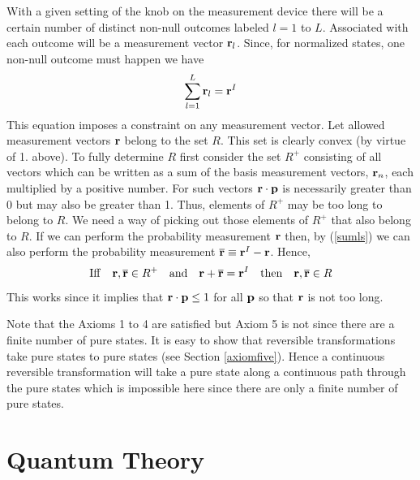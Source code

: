 \documentclass[10pt,twocolumn]{article}
\begin{document}
With a given setting of the knob on the measurement device there will be
a certain number of distinct non-null outcomes labeled $l=1$ to $L$.
Associated with each outcome will be a measurement vector ${\bf r}_l$.
Since, for normalized states, one non-null outcome must happen we have
\begin{equation}\label{sumls}
\sum_{l=1}^L {\bf r}_l = {\bf r}^I
\end{equation}
This equation imposes a constraint on any measurement vector. Let
allowed measurement vectors ${\bf r}$ belong to the set $R$. This
set is
clearly convex (by virtue of 1. above).  To fully determine $R$ first
consider the set $R^+$ consisting of all vectors which can be written
as a sum of the basis measurement vectors, ${\bf r}_n$,
each multiplied by a positive number. For
such vectors ${\bf r}\cdot{\bf p}$ is necessarily greater than 0 but may
also be greater than 1.  Thus, elements of $R^+$ may be too long to
belong to $R$.  We need a way of picking out those
elements of $R^+$ that also belong to $R$. If we can perform the
probability measurement ${\bf r}$ then, by (\ref{sumls})
we can also perform the probability measurement
$\overline{\bf r}\equiv {\bf r}^I - {\bf r}$. Hence,
\begin{equation}
{\rm Iff} \quad {\bf r},\overline{\bf r}\in R^+ \quad {\rm and} \quad
{\bf r}+\overline{\bf r}={\bf r}^I \quad{\rm then}\quad {\bf r},\overline{\bf r}\in R
\end{equation}
This works since it implies that ${\bf r}\cdot{\bf p} \leq 1$ for all ${\bf
p}$ so that ${\bf r}$ is not too long.

Note that the Axioms 1 to 4 are satisfied but Axiom 5 is not since there
are a finite number of pure states.  It is easy to show that reversible
transformations take pure states to pure states (see Section
\ref{axiomfive}). Hence a continuous reversible transformation will take
a pure state along a continuous path through the pure states which is
impossible here since there are only a finite number of pure states.


\section{Quantum Theory}\label{qtheory}
\end{document}
